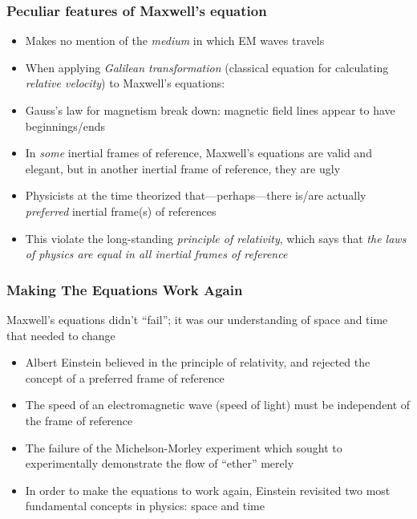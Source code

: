 \documentclass[12pt,compress,aspectratio=169]{beamer}
\begin{document}
\begin{frame}
  \frametitle{Peculiar features of Maxwell's equation}
  \begin{itemize}
  \item Makes no mention of the \emph{medium} in which EM waves travels
  \item When applying \emph{Galilean transformation} (classical equation for
    calculating \emph{relative velocity}) to Maxwell's equations:
  \item Gauss's law for magnetism break down: magnetic field lines appear to
    have beginnings/ends
  \item In \emph{some} inertial frames of reference,
    Maxwell's equations are valid and elegant, but in another inertial frame
    of reference, they are ugly
  \item Physicists at the time theorized that---perhaps---there is/are actually
    \emph{preferred} inertial frame(s) of references
  \item This violate the long-standing
    \emph{principle of relativity}, which says that
    \emph{the laws of physics are equal in all inertial frames of reference}
  \end{itemize}
\end{frame}



\begin{frame}
  \frametitle{Making The Equations Work Again}
  Maxwell's equations didn't ``fail''; it was our understanding of space and
  time that needed to change
  \begin{itemize}
  \item Albert Einstein believed in the principle of relativity, and rejected
    the concept of a preferred frame of reference
  \item The speed of an electromagnetic wave (speed of light) must be
    independent of the frame of reference
  \item The failure of the Michelson-Morley experiment which sought to
    experimentally demonstrate the flow of ``ether'' merely
  \item In order to make the equations to work again, Einstein revisited two
    most fundamental concepts in physics: space and time
  \end{itemize}
\end{frame}
\end{document}
